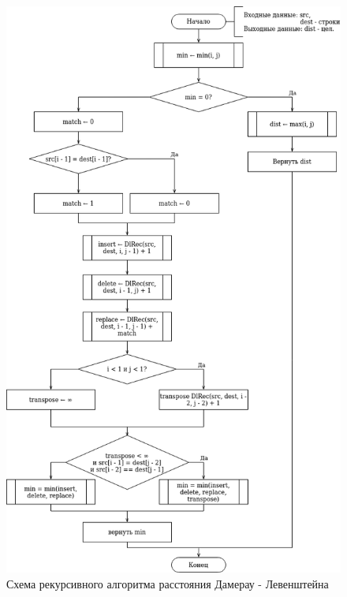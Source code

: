 \begin{figure}[h!]
	\begin{center}
		\includegraphics[scale=0.6]{assets/d-leven-recursive.png}
	\end{center}
	
	\caption{Схема рекурсивного алгоритма расстояния Дамерау - Левенштейна}
	\label{fig:d-recur}
\end{figure}

